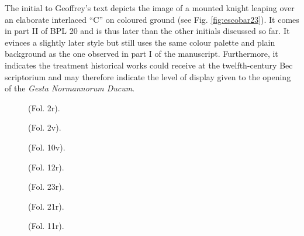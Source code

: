 \begin{paper}
The initial to Geoffrey's text depicts the image of a mounted knight
leaping over an elaborate interlaced ``C'' on coloured ground (see Fig.
\ref{fig:escobar23}). It comes in part II of BPL 20 and is thus later than the other
initials discussed so far. It evinces a slightly later style but still
uses the same colour palette and plain background as the one observed in
part I of the manuscript. Furthermore, it indicates the treatment
historical works could receive at the twelfth-century Bec scriptorium
and may therefore indicate the level of display given to the opening of
the \emph{Gesta Normannorum Ducum}.

\begin{figure}[H]
  \centering
  \begin{minipage}[b]{0.48\textwidth}
    \caption{(Fol. 2r).}
    \label{fig:escobar5}
  \end{minipage}
  \hfill
  \begin{minipage}[b]{0.49\textwidth}
    \caption{(Fol. 2v).}
    \label{fig:escobar6}
  \end{minipage}
\end{figure}

\begin{figure}[H]
  \centering
    \caption{(Fol. 10v).}
    \label{fig:escobar7}
  \end{figure}

\begin{figure}[H]
  \centering
    \caption{(Fol. 12r).}
    \label{fig:escobar8}
  \end{figure}

\begin{figure}[H]
  \centering
  \begin{minipage}[b]{0.25\textwidth}
    \caption{(Fol. 23r).}
    \label{fig:escobar9}
  \end{minipage}
  \hfill
  \begin{minipage}[b]{0.275\textwidth}
    \caption{(Fol. 21r).}
    \label{fig:escobar10}
  \end{minipage}
    \hfill
  \begin{minipage}[b]{0.36\textwidth}
    \caption{(Fol. 11r).}
    \label{fig:escobar11}
  \end{minipage}
\end{figure}


\end{paper}
